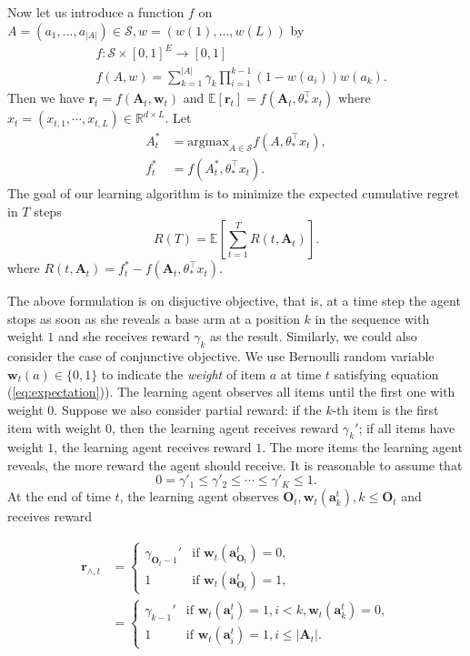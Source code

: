 \documentclass{article}
\newcommand{\EE}{\mathbb{E}}
\newcommand{\RR}{\mathbb{R}}
\newcommand{\bA}{\mathbf{A}}
\newcommand{\ba}{\mathbf{a}}
\newcommand{\bO}{\mathbf{O}}
\newcommand{\br}{\mathbf{r}}
\newcommand{\bw}{\mathbf{w}}
\newcommand{\cS}{\mathcal{S}}
\newcommand{\argmax}{\mathrm{argmax}}
\newcommand{\abs}[1]{\left| #1 \right|}
\newcommand{\wei}[1]{}
\newcommand{\wei}[1]{{\color{blue!50!black}  [\text{Wei:} #1]}}
\begin{document}
Now let us introduce a function $f$ on $A = (a_1,...,a_{\abs{A}}) \in \cS, w = (w(1),...,w(L))$ by
\begin{align*}
&f : \cS \times [0,1]^E \to [0,1]\\
&f(A,w) = \sum_{k = 1}^{\abs{A}} \gamma_{k} \prod_{i=1}^{k-1} (1 - w(a_i)) w(a_k).
\end{align*}
Then we have $\br_t = f(\bA_t, \bw_t)$ and $\EE[\br_t] = f(\bA_t, \theta_{\ast}^{\top}x_t)$ where $x_t = (x_{t,1}, \cdots, x_{t,L}) \in \RR^{d \times L}$. Let 
\begin{align*}
A_t^{\ast} &= \argmax_{A\in \cS} f(A,\theta_{\ast}^{\top}x_t),\\
f_t^{\ast} &= f(A_t^{\ast}, \theta_{\ast}^{\top}x_t).
\end{align*}
The goal of our learning algorithm is to minimize the expected cumulative regret in $T$ steps
$$
R(T) = \EE[\sum_{t=1}^T R(t, \bA_t)].
$$
where $R(t, \bA_t) = f_t^{\ast} - f(\bA_t, \theta_{\ast}^{\top}x_t)$.

The above formulation is on disjuctive objective, that is, at a time step the agent stops as soon as she reveals a base arm
	at a position $k$ in the sequence with weight $1$ and she receives reward $\gamma_k$ as the result.
Similarly, we could also consider the case of conjunctive objective. We use Bernoulli random variable $\bw_{t}(a) \in \{0,1\}$ to indicate the {\it weight} of item $a$ at time $t$ satisfying equation (\ref{eq:expectation})). The learning agent observes all items until the first one with weight $0$. Suppose we also consider partial reward: if the $k$-th item is the first item with weight $0$, then the learning agent receives reward $\gamma_k'$; if all items have weight $1$, the learning agent receives reward $1$. The more items the learning agent reveals, the more reward the agent should receive. It is reasonable to assume that
$$
0 = \gamma'_1 \leq \gamma'_2 \leq \cdots \leq \gamma'_K \leq 1.
$$
At the end of time $t$, the learning agent observes $\bO_t, \bw_t(\ba_k^t), k \leq \bO_t$ and receives reward
\wei{For the following, why using $\gamma_{\bO_t - 1}'$ and $\gamma_{k - 1}'$ instead of
	$\gamma_{\bO_t}'$ and $\gamma_{k}'$. It is inconsistent with the above description, and I think the latter makes sense.}
\begin{align*}
\br_{\wedge, t} &= \begin{cases}
\gamma_{\bO_t - 1}'  &\text{if } \bw_t(\ba_{\bO_t}^t) = 0,\\
1 &\text{if } \bw_t(\ba_{\bO_t}^t) = 1,
\end{cases}\\
&=\begin{cases}
\gamma_{k - 1}'  &\text{if } \bw_t(\ba_{i}^t) = 1, i < k, \bw_t(\ba_{k}^t) = 0,\\
1 &\text{if } \bw_t(\ba_{i}^t) = 1, i\leq \abs{\bA_t}.
\end{cases}
\end{align*}
\end{document}
